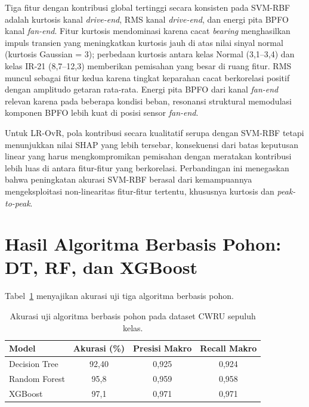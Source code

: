 Tiga fitur dengan kontribusi global tertinggi secara konsisten pada SVM-RBF
adalah kurtosis kanal \emph{drive-end}, RMS kanal \emph{drive-end}, dan
energi pita BPFO kanal \emph{fan-end}.
Fitur kurtosis mendominasi karena cacat \emph{bearing} menghasilkan impuls transien yang
meningkatkan kurtosis jauh di atas nilai sinyal normal (kurtosis Gaussian
= 3); perbedaan kurtosis antara kelas Normal (3,1–3,4) dan kelas IR-21 (8,7–12,3)
memberikan pemisahan yang besar di ruang fitur.
RMS muncul sebagai fitur kedua karena tingkat keparahan cacat berkorelasi
positif dengan amplitudo getaran rata-rata.
Energi pita BPFO dari kanal \emph{fan-end} relevan karena pada beberapa
kondisi beban, resonansi struktural memodulasi komponen BPFO lebih kuat
di posisi sensor \emph{fan-end}.

Untuk LR-OvR, pola kontribusi secara kualitatif serupa dengan SVM-RBF
tetapi menunjukkan nilai SHAP yang lebih tersebar, konsekuensi dari batas
keputusan linear yang harus mengkompromikan pemisahan dengan meratakan
kontribusi lebih luas di antara fitur-fitur yang berkorelasi.
Perbandingan ini menegaskan bahwa peningkatan akurasi SVM-RBF berasal dari
kemampuannya mengeksploitasi non-linearitas fitur-fitur tertentu, khususnya
kurtosis dan \emph{peak-to-peak}.

\section{Hasil Algoritma Berbasis Pohon: DT, RF, dan XGBoost}
\label{sec:bab4_hasil_tree}

Tabel~\ref{tab:bab4_hasil_tree} menyajikan akurasi uji tiga algoritma
berbasis pohon.

\begin{table}[ht]
\caption{Akurasi uji algoritma berbasis pohon pada dataset CWRU sepuluh kelas.}
\label{tab:bab4_hasil_tree}
\centering
\begin{tabular}{lccc}
\toprule
\textbf{Model} & \textbf{Akurasi (\%)} & \textbf{Presisi Makro} & \textbf{Recall Makro}\\
\midrule
Decision Tree & 92,40 & 0,925 & 0,924\\
Random Forest & 95,8  & 0,959 & 0,958\\
XGBoost       & 97,1  & 0,971 & 0,971\\
\bottomrule
\end{tabular}
\end{table}

